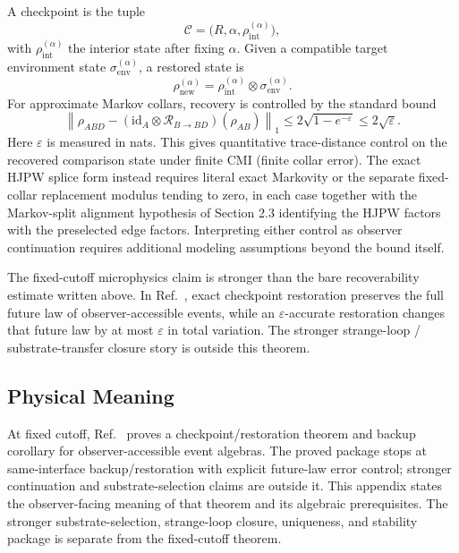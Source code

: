 A checkpoint is the tuple
\[
\mathcal{C}=\bigl(R,\alpha,\rho_{\mathrm{int}}^{(\alpha)}\bigr),
\]
with \(\rho_{\mathrm{int}}^{(\alpha)}\) the interior state after fixing \(\alpha\). Given a compatible target
environment state \(\sigma_{\mathrm{env}}^{(\alpha)}\), a restored state is
\[
\rho_{\mathrm{new}}^{(\alpha)}
=
\rho_{\mathrm{int}}^{(\alpha)}
\otimes
\sigma_{\mathrm{env}}^{(\alpha)}.
\]
For approximate Markov collars, recovery is controlled by the standard bound
\[
\left\|
\rho_{ABD}
-
(\mathrm{id}_A\otimes\mathcal{R}_{B\to BD})(\rho_{AB})
\right\|_1
\le
2\sqrt{1-e^{-\varepsilon}}
\le2\sqrt{\varepsilon}.
\]
Here \(\varepsilon\) is measured in nats. This gives quantitative trace-distance control on the recovered comparison state under finite CMI
(finite collar error). The exact HJPW splice form instead requires literal exact Markovity or the
separate fixed-collar replacement modulus tending to zero, in each case together with the
Markov-split alignment hypothesis of Section 2.3 identifying the HJPW factors with the preselected
edge factors. Interpreting either control as observer
continuation requires additional modeling assumptions beyond the bound itself.

The fixed-cutoff microphysics claim is stronger than the bare recoverability estimate written
above. In Ref.~\cite{ophmicrophysics}, exact checkpoint restoration preserves the full future
law of observer-accessible events, while an \(\varepsilon\)-accurate restoration changes that
future law by at most \(\varepsilon\) in total variation. The stronger strange-loop / substrate-transfer closure story
is outside this theorem.

\subsection{Physical Meaning}

At fixed cutoff, Ref.~\cite{ophmicrophysics} proves a checkpoint/restoration theorem and backup
corollary for observer-accessible event algebras. The proved package stops at same-interface
backup/restoration with explicit future-law error control; stronger continuation and
substrate-selection claims are outside it. This appendix states the observer-facing meaning
of that theorem and its algebraic prerequisites. The stronger substrate-selection, strange-loop
closure, uniqueness, and stability package is separate from the fixed-cutoff theorem.



